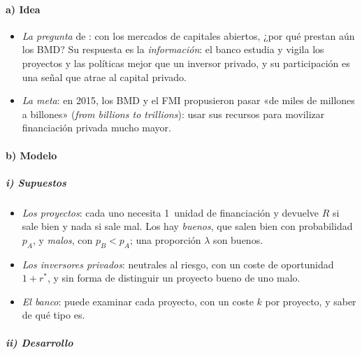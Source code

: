 \documentclass[11pt]{article}
\begin{document}
\paragraph{a) Idea}

\begin{itemize}
\item \emph{La pregunta} de \textcite{Rodrik1995Why}: con los mercados de capitales abiertos, ¿por qué prestan aún los BMD? Su respuesta es la \emph{información}: el banco estudia y vigila los proyectos y las políticas mejor que un inversor privado, y su participación es una señal que atrae al capital privado.
\item \emph{La meta}: en 2015, los BMD y el FMI propusieron pasar «de miles de millones a billones» (\emph{from billions to trillions}): usar sus recursos para movilizar financiación privada mucho mayor\nocite{BMD2015BillionsTrillions}.
\end{itemize}

\paragraph{b) Modelo}

\subparagraph{i) Supuestos}

\begin{itemize}
\item \emph{Los proyectos}: cada uno necesita 1~unidad de financiación y devuelve $R$ si sale bien y nada si sale mal. Los hay \emph{buenos}, que salen bien con probabilidad $p_A$, y \emph{malos}, con $p_B<p_A$; una proporción $\lambda$ son buenos.
\item \emph{Los inversores privados}: neutrales al riesgo, con un coste de oportunidad $1+r^*$, y sin forma de distinguir un proyecto bueno de uno malo.
\item \emph{El banco}: puede examinar cada proyecto, con un coste $k$ por proyecto, y saber de qué tipo es.
\end{itemize}

\subparagraph{ii) Desarrollo}
\end{document}

